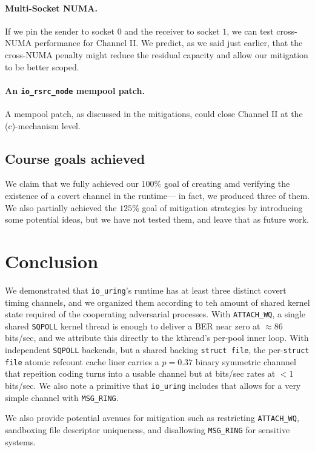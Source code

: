 \documentclass[letterpaper,twocolumn,10pt]{article}
\newcommand{\code}[1]{\texttt{#1}}
\newcommand{\iouring}{\texttt{io\_uring}\xspace}
\begin{document}
\paragraph{Multi-Socket NUMA.} If we pin the sender to socket $0$ and the receiver to socket $1$, we can test cross-NUMA performance for Channel II. We predict, as we said just earlier, that the cross-NUMA penalty might reduce the residual capacity and allow our mitigation to be better scoped.

\paragraph{An \code{io\_rsrc\_node} mempool patch.} A mempool patch, as discussed in the mitigations, could close Channel II at the (c)-mechanism level.

\subsection{Course goals achieved}
We claim that we fully achieved our $100\%$ goal of creating amd verifying the existence of a covert channel in the runtime--- in fact, we produced three of them. We also partially achieved the $125\%$ goal of mitigation strategies by introducing some potential ideas, but we have not tested them, and leave that as future work.

\section{Conclusion}
We demonstrated that \iouring's runtime has at least three distinct covert timing channels, and we organized them according to teh amount of shared kernel state required of the cooperating adversarial processes. With \code{ATTACH\_WQ}, a single shared \code{SQPOLL} kernel thread is enough to deliver a BER near zero at $\approx 86$ bits/sec, and we attribute this directly to the kthread's per-pool inner loop. With independent \code{SQPOLL} backends, but a shared backing \code{struct file}, the per-\code{struct file} atomic refcount cache liner carries a $p = 0.37$ binary symmetric channnel that repeition coding turns into a usable channel but at bits/sec rates at $< 1$ bits/sec. We also note a primitive that \iouring includes that allows for a very simple channel with \code{MSG\_RING}.

We also provide potential avenues for mitigation such as restricting \code{ATTACH\_WQ}, sandboxing file descriptor uniqueness, and disallowing \code{MSG\_RING} for sensitive systems. 


\end{document}
